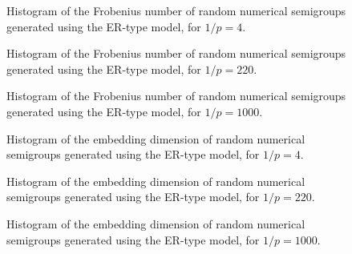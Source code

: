 \begin{figure}
    \begin{center}
        
    \end{center}
    \caption{Histogram of the Frobenius number of random numerical semigroups generated using the ER-type model, for $1/p = 4$.}
    \label{fig:frobenius_hist4}
\end{figure}

\begin{figure}
    \begin{center}
        
    \end{center}
    \caption{Histogram of the Frobenius number of random numerical semigroups generated using the ER-type model, for $1/p = 220$.}
    \label{fig:frobenius_hist220}
\end{figure}

\begin{figure}
    \begin{center}
        
    \end{center}
    \caption{Histogram of the Frobenius number of random numerical semigroups generated using the ER-type model, for $1/p = 1000$.}
    \label{fig:frobenius_hist1000}
\end{figure}

\begin{figure}
    \begin{center}
        
    \end{center}
    \caption{Histogram of the embedding dimension of random numerical semigroups generated using the ER-type model, for $1/p = 4$.}
    \label{fig:embedding_hist4}
\end{figure}

\begin{figure}
    \begin{center}
        
    \end{center}
    \caption{Histogram of the embedding dimension of random numerical semigroups generated using the ER-type model, for $1/p = 220$.}
    \label{fig:embedding_hist220}
\end{figure}

\begin{figure}
    \begin{center}
        
    \end{center}
    \caption{Histogram of the embedding dimension of random numerical semigroups generated using the ER-type model, for $1/p = 1000$.}
    \label{fig:embedding_hist1000}
\end{figure}
    
